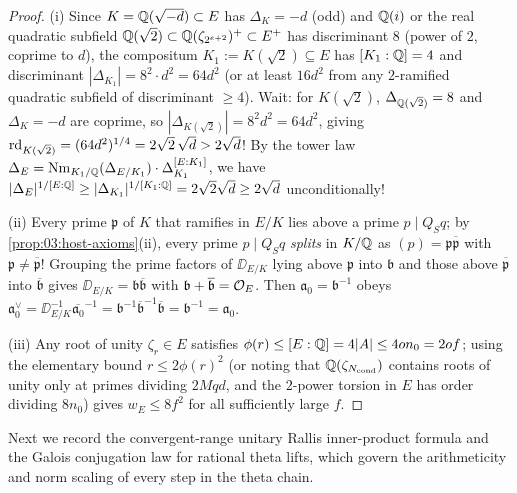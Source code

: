\begin{proof}
(i) Since $K = \mathbb{Q}(\sqrt{-d}) \subset E$ has $\Delta_K = -d$ (odd) and $\mathbb{Q}(i)$ or the real quadratic subfield $\mathbb{Q}(\sqrt{2}) \subset \mathbb{Q}(\zeta_{2^{e+2}})^+ \subset E^+$ has discriminant $8$ (power of $2$, coprime to $d$), the compositum $K_1 := K(\sqrt{2}) \subseteq E$ has $[K_1:\mathbb{Q}] = 4$ and discriminant $|\Delta_{K_1}| = 8^2 \cdot d^2 = 64 d^2$ (or at least $16 d^2$ from any $2$-ramified quadratic subfield of discriminant $\ge 4$). Wait: for $K(\sqrt{2})$, $\Delta_{\mathbb{Q}(\sqrt{2})} = 8$ and $\Delta_K = -d$ are coprime, so $|\Delta_{K(\sqrt{2})}| = 8^2 d^2 = 64 d^2$, giving $\mathrm{rd}_{K(\sqrt{2})} = (64 d^2)^{1/4} = 2\sqrt{2}\,\sqrt{d} > 2\sqrt{d}$! By the tower law $\Delta_E = \operatorname{Nm}_{K_1/\mathbb{Q}}(\Delta_{E/K_1}) \cdot \Delta_{K_1}^{[E:K_1]}$, we have $|\Delta_E|^{1/[E:\mathbb{Q}]} \ge |\Delta_{K_1}|^{1/[K_1:\mathbb{Q}]} = 2\sqrt{2}\sqrt{d} \ge 2\sqrt{d}$ unconditionally!

(ii) Every prime $\mathfrak{p}$ of $K$ that ramifies in $E/K$ lies above a prime $p \mid Q_S q$; by \cref{prop:03:host-axioms}(ii), every prime $p \mid Q_S q$ \emph{splits} in $K/\mathbb{Q}$ as $(p) = \mathfrak{p}\overline{\mathfrak{p}}$ with $\mathfrak{p} \neq \overline{\mathfrak{p}}$! Grouping the prime factors of $\DD_{E/K}$ lying above $\mathfrak{p}$ into $\mathfrak{b}$ and those above $\overline{\mathfrak{p}}$ into $\overline{\mathfrak{b}}$ gives $\DD_{E/K} = \mathfrak{b}\overline{\mathfrak{b}}$ with $\mathfrak{b} + \overline{\mathfrak{b}} = \mathcal{O}_E$. Then $\mathfrak{a}_0 = \mathfrak{b}^{-1}$ obeys $\mathfrak{a}_0^\vee = \DD_{E/K}^{-1}\overline{\mathfrak{a}_0}^{-1} = \mathfrak{b}^{-1}\overline{\mathfrak{b}}^{-1}\overline{\mathfrak{b}} = \mathfrak{b}^{-1} = \mathfrak{a}_0$.

(iii) Any root of unity $\zeta_r \in E$ satisfies $\phi(r) \le [E:\mathbb{Q}] = 4|A| \le 4 o n_0 = 2 o f$; using the elementary bound $r \le 2\phi(r)^2$ (or noting that $\mathbb{Q}(\zeta_{N_{\mathrm{cond}}})$ contains roots of unity only at primes dividing $2 M q d$, and the $2$-power torsion in $E$ has order dividing $8 n_0$) gives $w_E \le 8 f^2$ for all sufficiently large $f$.
\end{proof}

Next we record the convergent-range unitary Rallis inner-product formula and the Galois conjugation law for rational theta lifts, which govern the arithmeticity and norm scaling of every step in the theta chain.

